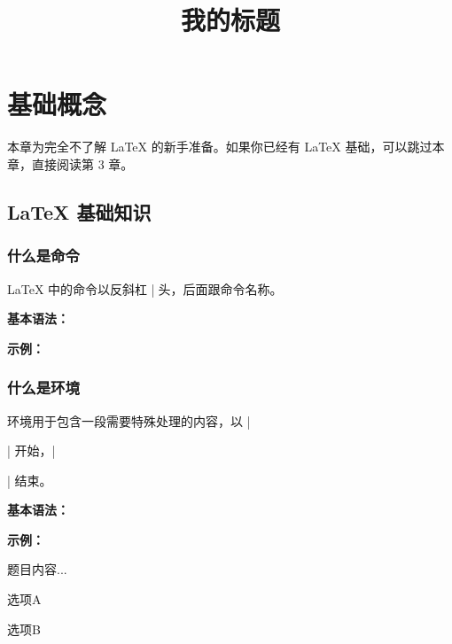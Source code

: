 
\section{基础概念}

本章为完全不了解 \LaTeX{} 的新手准备。如果你已经有 \LaTeX{} 基础，可以跳过本章，直接阅读第 3 章。

\subsection{LaTeX 基础知识}

\subsubsection{什么是命令}

\LaTeX{} 中的命令以反斜杠 |\| 开头，后面跟命令名称。

\textbf{基本语法：}
\begin{latexcode}
\end{latexcode}

\textbf{示例：}
\begin{latexcode}
  \title{我的标题}           %
  \maketitle                 %
\end{latexcode}

\subsubsection{什么是环境}

环境用于包含一段需要特殊处理的内容，以 |\begin{环境名}| 开始，|\end{环境名}| 结束。

\textbf{基本语法：}

\textbf{示例：}
\begin{latexcode}
  \begin{question}
    题目内容...
  \end{question}

  \begin{choices}
    \item 选项A
    \item 选项B
  \end{choices}
\end{latexcode}

